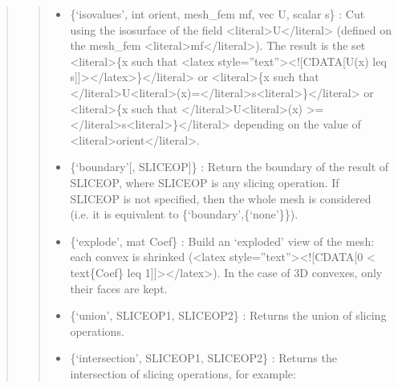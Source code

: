 \documentclass[a4paper,11pt,english]{sphinxmanual}
\begin{document}
\begin{quote}
\begin{quote}
\begin{itemize}
\item {} 
\sphinxAtStartPar
\{‘isovalues’, int orient, mesh\_fem mf, vec U, scalar s\} :
Cut using the isosurface of the field \textless{}literal\textgreater{}U\textless{}/literal\textgreater{} (defined on the mesh\_fem \textless{}literal\textgreater{}mf\textless{}/literal\textgreater{}).
The result is the set \textless{}literal\textgreater{}\{x such that \textless{}latex style=”text”\textgreater{}\textless{}!{[}CDATA{[}U(x) leq s{]}{]}\textgreater{}\textless{}/latex\textgreater{}\}\textless{}/literal\textgreater{} or \textless{}literal\textgreater{}\{x such that
\textless{}/literal\textgreater{}U\textless{}literal\textgreater{}(x)=\textless{}/literal\textgreater{}s\textless{}literal\textgreater{}\}\textless{}/literal\textgreater{} or \textless{}literal\textgreater{}\{x such that \textless{}/literal\textgreater{}U\textless{}literal\textgreater{}(x) \textgreater{}= \textless{}/literal\textgreater{}s\textless{}literal\textgreater{}\}\textless{}/literal\textgreater{} depending on the value of
\textless{}literal\textgreater{}orient\textless{}/literal\textgreater{}.

\item {} 
\sphinxAtStartPar
\{‘boundary’{[}, SLICEOP{]}\} :
Return the boundary of the result of SLICEOP, where SLICEOP is any
slicing operation. If SLICEOP is not specified, then the whole mesh is
considered (i.e. it is equivalent to \{‘boundary’,\{‘none’\}\}).

\item {} 
\sphinxAtStartPar
\{‘explode’, mat Coef\} :
Build an ‘exploded’ view of the mesh: each convex is shrinked (\textless{}latex style=”text”\textgreater{}\textless{}!{[}CDATA{[}0 \textless{}
text\{Coef\} leq 1{]}{]}\textgreater{}\textless{}/latex\textgreater{}). In the case of 3D convexes, only their faces are kept.

\item {} 
\sphinxAtStartPar
\{‘union’, SLICEOP1, SLICEOP2\} :
Returns the union of slicing operations.

\item {} 
\sphinxAtStartPar
\{‘intersection’, SLICEOP1, SLICEOP2\} :
Returns the intersection of slicing operations, for example:

\begin{sphinxVerbatim}[commandchars=\\\{\}]
  
\end{sphinxVerbatim}


\end{itemize}
\end{quote}
\end{quote}
\end{document}
